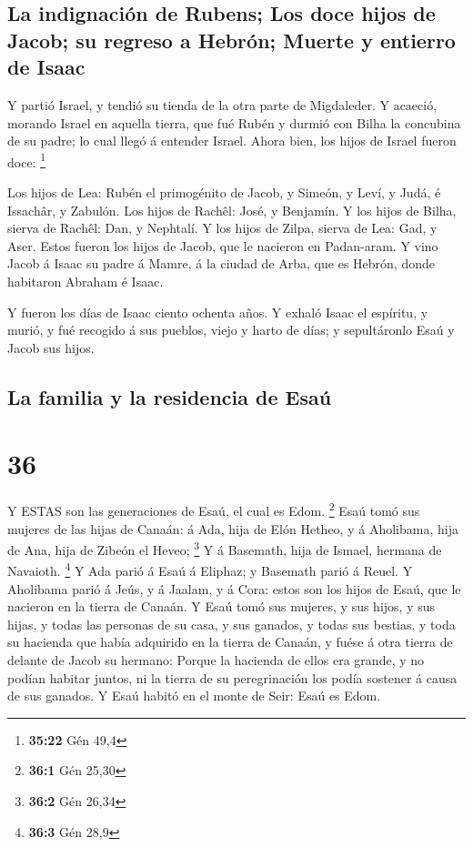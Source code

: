 \hypertarget{la-indignaciuxf3n-de-rubens-los-doce-hijos-de-jacob-su-regreso-a-hebruxf3n-muerte-y-entierro-de-isaac}{%
\subsection{La indignación de Rubens; Los doce hijos de Jacob; su
regreso a Hebrón; Muerte y entierro de
Isaac}\label{la-indignaciuxf3n-de-rubens-los-doce-hijos-de-jacob-su-regreso-a-hebruxf3n-muerte-y-entierro-de-isaac}}

 Y partió Israel, y tendió su tienda de la otra parte de
Migdaleder.  Y acaeció, morando Israel en aquella tierra,
que fué Rubén y durmió con Bilha la concubina de su padre; lo cual llegó
á entender Israel. Ahora bien, los hijos de Israel fueron doce:
\footnote{\textbf{35:22} Gén 49,4}

 Los hijos de Lea: Rubén el primogénito de Jacob, y Simeón,
y Leví, y Judá, é Issachâr, y Zabulón.  Los hijos de
Rachêl: José, y Benjamín.  Y los hijos de Bilha, sierva de
Rachêl: Dan, y Nephtalí.  Y los hijos de Zilpa, sierva de
Lea: Gad, y Aser. Estos fueron los hijos de Jacob, que le nacieron en
Padan-aram.  Y vino Jacob á Isaac su padre á Mamre, á la
ciudad de Arba, que es Hebrón, donde habitaron Abraham é Isaac.

 Y fueron los días de Isaac ciento ochenta años.
 Y exhaló Isaac el espíritu, y murió, y fué recogido á sus
pueblos, viejo y harto de días; y sepultáronlo Esaú y Jacob sus hijos.

\hypertarget{la-familia-y-la-residencia-de-esauxfa}{%
\subsection{La familia y la residencia de
Esaú}\label{la-familia-y-la-residencia-de-esauxfa}}

\hypertarget{section-35}{%
\section{36}\label{section-35}}

 Y ESTAS son las generaciones de Esaú, el cual es Edom.
\footnote{\textbf{36:1} Gén 25,30}  Esaú tomó sus mujeres de
las hijas de Canaán: á Ada, hija de Elón Hetheo, y á Aholibama, hija de
Ana, hija de Zibeón el Heveo; \footnote{\textbf{36:2} Gén 26,34}
 Y á Basemath, hija de Ismael, hermana de Navaioth.
\footnote{\textbf{36:3} Gén 28,9}  Y Ada parió á Esaú á
Eliphaz; y Basemath parió á Reuel.  Y Aholibama parió á
Jeús, y á Jaalam, y á Cora: estos son los hijos de Esaú, que le nacieron
en la tierra de Canaán.  Y Esaú tomó sus mujeres, y sus
hijos, y sus hijas, y todas las personas de su casa, y sus ganados, y
todas sus bestias, y toda su hacienda que había adquirido en la tierra
de Canaán, y fuése á otra tierra de delante de Jacob su hermano:
 Porque la hacienda de ellos era grande, y no podían habitar
juntos, ni la tierra de su peregrinación los podía sostener á causa de
sus ganados.  Y Esaú habitó en el monte de Seir: Esaú es
Edom.

